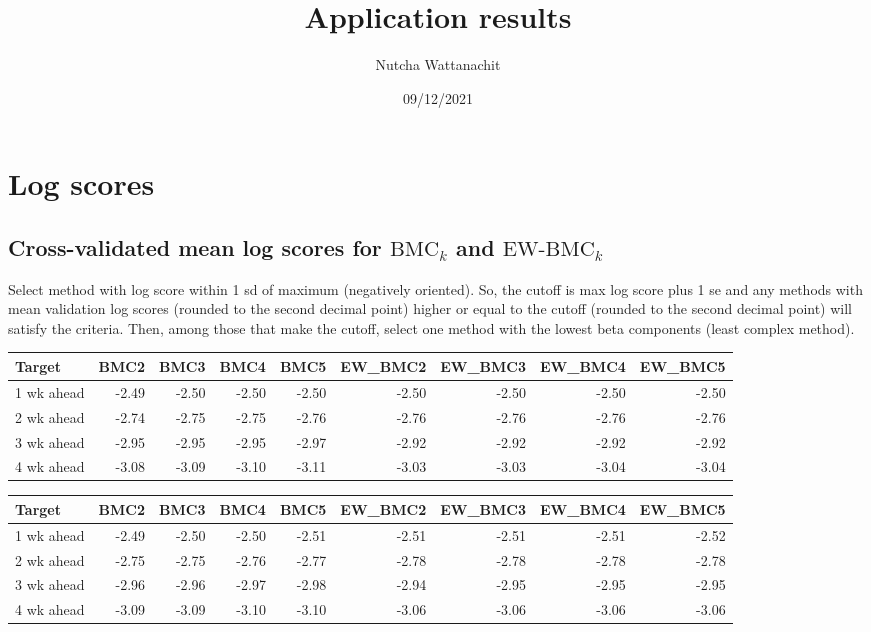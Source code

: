 \documentclass[
]{article}
\title{Application results}
\author{Nutcha Wattanachit}
\date{09/12/2021}
\begin{document}
\maketitle

\hypertarget{log-scores}{%
\section{Log scores}\label{log-scores}}

\hypertarget{cross-validated-mean-log-scores-for-textbmc_k-and-textew-bmc_k}{%
\subsection{\texorpdfstring{Cross-validated mean log scores for
\(\text{BMC}_k\) and
\(\text{EW-BMC}_k\)}{Cross-validated mean log scores for \textbackslash text\{BMC\}\_k and \textbackslash text\{EW-BMC\}\_k}}\label{cross-validated-mean-log-scores-for-textbmc_k-and-textew-bmc_k}}

Select method with log score within 1 sd of maximum (negatively
oriented). So, the cutoff is max log score plus 1 se and any methods
with mean validation log scores (rounded to the second decimal point)
higher or equal to the cutoff (rounded to the second decimal point) will
satisfy the criteria. Then, among those that make the cutoff, select one
method with the lowest beta components (least complex method).

\begin{tabular}{l|r|r|r|r|r|r|r|r}
\hline
Target & BMC2 & BMC3 & BMC4 & BMC5 & EW\_BMC2 & EW\_BMC3 & EW\_BMC4 & EW\_BMC5\\
\hline
1 wk ahead & -2.49 & -2.50 & -2.50 & -2.50 & -2.50 & -2.50 & -2.50 & -2.50\\
\hline
2 wk ahead & -2.74 & -2.75 & -2.75 & -2.76 & -2.76 & -2.76 & -2.76 & -2.76\\
\hline
3 wk ahead & -2.95 & -2.95 & -2.95 & -2.97 & -2.92 & -2.92 & -2.92 & -2.92\\
\hline
4 wk ahead & -3.08 & -3.09 & -3.10 & -3.11 & -3.03 & -3.03 & -3.04 & -3.04\\
\hline
\end{tabular}

\begin{tabular}{l|r|r|r|r|r|r|r|r}
\hline
Target & BMC2 & BMC3 & BMC4 & BMC5 & EW\_BMC2 & EW\_BMC3 & EW\_BMC4 & EW\_BMC5\\
\hline
1 wk ahead & -2.49 & -2.50 & -2.50 & -2.51 & -2.51 & -2.51 & -2.51 & -2.52\\
\hline
2 wk ahead & -2.75 & -2.75 & -2.76 & -2.77 & -2.78 & -2.78 & -2.78 & -2.78\\
\hline
3 wk ahead & -2.96 & -2.96 & -2.97 & -2.98 & -2.94 & -2.95 & -2.95 & -2.95\\
\hline
4 wk ahead & -3.09 & -3.09 & -3.10 & -3.10 & -3.06 & -3.06 & -3.06 & -3.06\\
\hline
\end{tabular}
\end{document}
